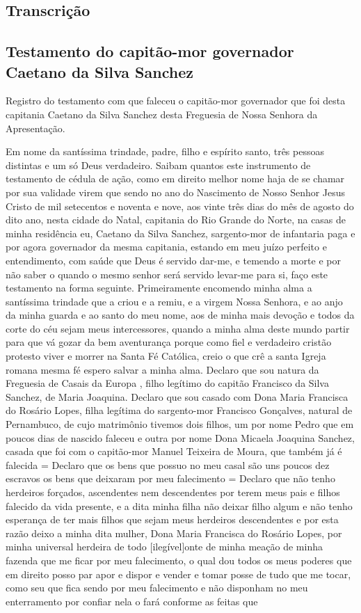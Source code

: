 \begin{refsection}
    \section{Transcrição}

    \subsection*{Testamento do capitão-mor governador Caetano da Silva Sanchez}

    Registro do testamento com que faleceu o capitão-mor governador que foi desta capitania Caetano da Silva Sanchez desta Freguesia de Nossa Senhora da Apresentação. 

    Em nome da santíssima trindade, padre, filho e espírito santo, três pessoas distintas e um só Deus verdadeiro. Saibam quantos este instrumento de testamento de cédula de ação, como em direito melhor nome haja de se chamar por sua validade virem que sendo no ano do Nascimento de Nosso Senhor Jesus Cristo de mil setecentos e noventa e nove, aos vinte três dias do mês de agosto do dito ano, nesta cidade do Natal, capitania do Rio Grande do Norte, na casas de minha residência eu, Caetano da Silva Sanchez, sargento-mor de infantaria paga e por agora governador da mesma capitania, estando em meu juízo perfeito e entendimento, com saúde que Deus é servido dar-me, e temendo a morte e por não saber o quando o mesmo senhor será servido levar-me para si, faço este testamento na forma seguinte. Primeiramente encomendo minha alma a santíssima trindade que a criou e a remiu, e a virgem Nossa Senhora, e ao anjo da minha guarda e ao santo do meu nome, aos de minha mais devoção e todos da corte do céu sejam meus intercessores, quando a minha alma deste mundo partir para que vá gozar da bem aventurança porque como fiel e verdadeiro cristão protesto viver e morrer na Santa Fé Católica, creio o que crê a santa Igreja romana mesma fé espero salvar a minha alma. Declaro que sou natura da Freguesia de Casais da Europa , filho legítimo do capitão Francisco da Silva Sanchez, de Maria Joaquina. Declaro que sou casado com Dona Maria Francisca do Rosário Lopes, filha legítima do sargento-mor Francisco Gonçalves, natural de Pernambuco, de cujo matrimônio tivemos dois filhos, um por nome Pedro que em poucos dias de nascido faleceu e outra por nome Dona Micaela Joaquina Sanchez, casada que foi com o capitão-mor Manuel Teixeira de Moura, que também já é falecida = Declaro que os bens que possuo no meu casal são uns poucos dez escravos os bens que deixaram por meu falecimento = Declaro que não tenho herdeiros forçados, ascendentes nem descendentes por terem meus pais e filhos falecido da vida presente, e a dita minha filha não deixar filho algum e não tenho esperança de ter mais filhos que sejam meus herdeiros descendentes e por esta razão deixo a minha dita mulher, Dona Maria Francisca do Rosário Lopes, por minha universal herdeira de todo [ilegível]onte de minha meação de minha fazenda que me ficar por meu falecimento, o qual dou todos os meus poderes que em direito posso par apor e dispor e vender e tomar posse de tudo que me tocar, como seu que fica sendo por meu falecimento e não disponham no meu enterramento por confiar nela o fará conforme as feitas que 
\end{refsection}
